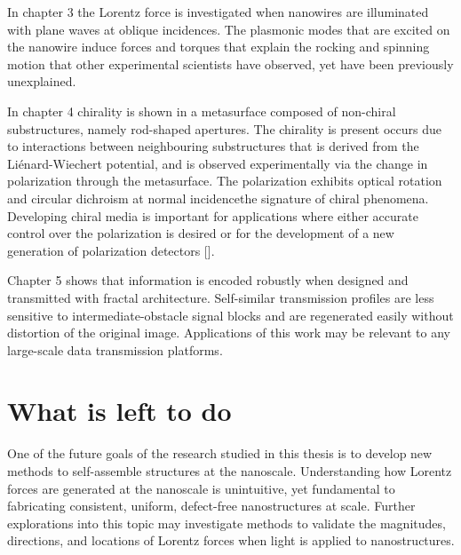 In chapter 3 the Lorentz force is investigated when nanowires are illuminated with plane waves at oblique incidences. The plasmonic modes that are excited on the nanowire induce forces and torques that explain the rocking and spinning motion that other experimental scientists have observed, yet have been previously unexplained.

In chapter 4 chirality is shown in a metasurface composed of non-chiral substructures, namely rod-shaped apertures.  The chirality is present occurs due to interactions between neighbouring substructures that is derived from the Li\'{e}nard-Wiechert potential, and is observed experimentally via the change in polarization through the metasurface. The polarization exhibits optical rotation and circular dichroism at normal incidence\textemdash the signature of chiral phenomena. Developing chiral media is important for applications where either accurate control over the polarization is desired or for the development of a new generation of polarization detectors [\cite{Mueller:16}].

Chapter 5 shows that information is encoded robustly when designed and transmitted with fractal architecture. Self-similar transmission profiles are less sensitive to intermediate-obstacle signal blocks and are regenerated easily without distortion of the original image. Applications of this work may be relevant to any large-scale data transmission platforms.


\section{What is left to do}
One of the future goals of the research studied in this thesis is to develop new methods to self-assemble structures at the nanoscale. Understanding how Lorentz forces are generated at the nanoscale is unintuitive, yet fundamental to fabricating consistent, uniform, defect-free nanostructures at scale. Further explorations into this topic may investigate methods to validate the magnitudes, directions, and locations of Lorentz forces when light is applied to nanostructures. 


